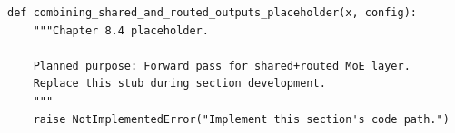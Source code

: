 \begin{lstlisting}[style=bookpython,caption={Planned code placeholder for combining shared and routed outputs.},label={lst:ch08-combining-shared-and-routed-outputs}]
def combining_shared_and_routed_outputs_placeholder(x, config):
    """Chapter 8.4 placeholder.

    Planned purpose: Forward pass for shared+routed MoE layer.
    Replace this stub during section development.
    """
    raise NotImplementedError("Implement this section's code path.")
\end{lstlisting}
